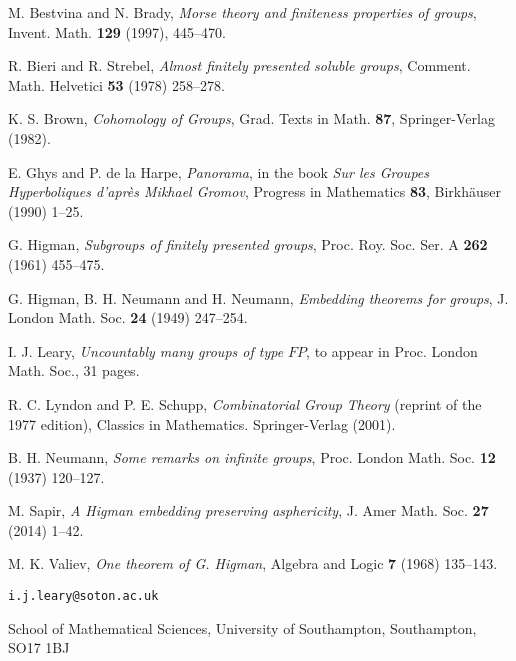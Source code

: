\documentclass[12pt,a4paper]{article}
\begin{document}
\begin{thebibliography}{19} 

 M. Bestvina and N. Brady, \emph{Morse theory and
  finiteness properties of groups}, Invent. Math. \textbf{129} (1997), 
445--470.  


 R. Bieri and R. Strebel, \emph{Almost finitely
  presented soluble groups}, Comment. Math. Helvetici \textbf{53} 
(1978) 258--278.  

 K. S. Brown, \emph{Cohomology of Groups}, Grad. Texts
 in Math. \textbf{87}, Springer-Verlag (1982).  

 E. Ghys and P. de la Harpe, \emph{Panorama}, in the 
book \emph{Sur les Groupes Hyperboliques d'apr\`es 
Mikhael Gromov}, Progress in Mathematics \textbf{83}, Birkh\"auser
(1990) 1--25.  

 G. Higman, \emph{Subgroups of finitely presented
  groups}, Proc. Roy. Soc. Ser. A \textbf{262} (1961) 455--475.  

 G. Higman, B. H. Neumann and H. Neumann, \emph{Embedding
  theorems for groups}, J. London Math. Soc. \textbf{24} (1949)
  247--254.  

 I. J. Leary, \emph{Uncountably many groups of type
  $FP$}, to appear in Proc. London Math. Soc., 31 pages.  

 R. C. Lyndon and P. E. Schupp, \emph{Combinatorial
  Group Theory} (reprint of the 1977 edition), Classics in Mathematics.
Springer-Verlag (2001).  

 B. H. Neumann, \emph{Some remarks on infinite
  groups}, Proc. London Math. Soc. \textbf{12} (1937) 120--127.  

 M. Sapir, \emph{A Higman embedding preserving
  asphericity}, J. Amer Math. Soc. \textbf{27} (2014) 1--42.  

 M. K. Valiev, \emph{One theorem of G. Higman},
  Algebra and Logic \textbf{7} (1968) 135--143.  

\end{thebibliography} 



\obeylines

\smallskip
{\tt i.j.leary@soton.ac.uk}

\smallskip
School of Mathematical Sciences, 
University of Southampton, 
Southampton,
SO17 1BJ 
\end{document}
